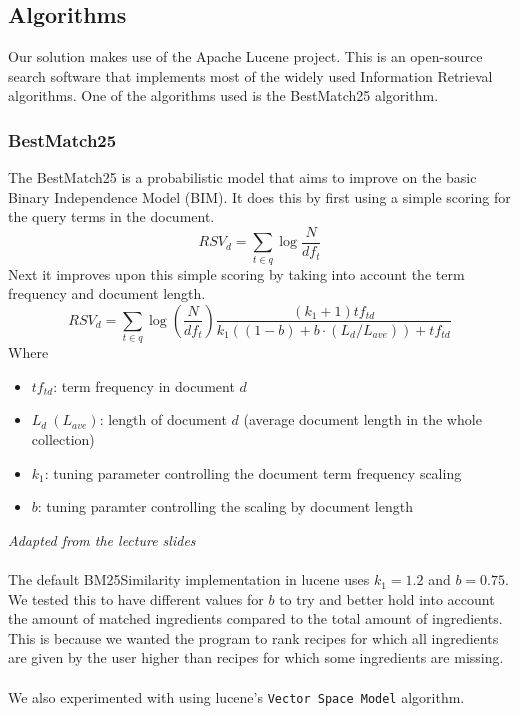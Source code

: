 \documentclass{article}
\begin{document}
\subsection{Algorithms}
Our solution makes use of the Apache Lucene project. This is an open-source
search software that implements most of the widely used Information Retrieval
algorithms. One of the algorithms used is the BestMatch25 algorithm.
\subsubsection{BestMatch25}
The BestMatch25 is a probabilistic model that aims to improve on the basic
Binary Independence Model (BIM). It does this by first using a simple scoring
for the query terms in the document.
$$RSV_d=\displaystyle\sum_{t\in q}\log \frac{N}{df_t}$$
Next it improves upon this simple scoring by taking into account the term
frequency and document length.
$$RSV_d=\displaystyle\sum_{t\in q}\log \left(\frac{N}{df_t}\right) \frac{(k_1 + 1) tf_{td}}{k_1((1 - b) + b \cdot (L_d/L_{ave}))+tf_{td}}$$
Where \begin{itemize}
    \item $tf_{td}$: term frequency in document $d$
    \item $L_d\ (L_{ave})$: length of document $d$ (average document length in the whole collection)
    \item $k_1$: tuning parameter controlling the document term frequency scaling
    \item $b$: tuning paramter controlling the scaling by document length
\end{itemize}
\small
\textit{Adapted from the lecture slides}\\~\\
\normalsize
The default BM25Similarity implementation in lucene uses $k_1 = 1.2$ and $b=0.75$.
We tested this to have different values for $b$ to try and better hold into account
the amount of matched ingredients compared to the total amount of ingredients.
This is because we wanted the program to rank recipes for which all ingredients are
given by the user higher than recipes for which some ingredients are missing.
\\~\\
We also experimented with using lucene's \texttt{Vector Space Model} algorithm.
\end{document}
